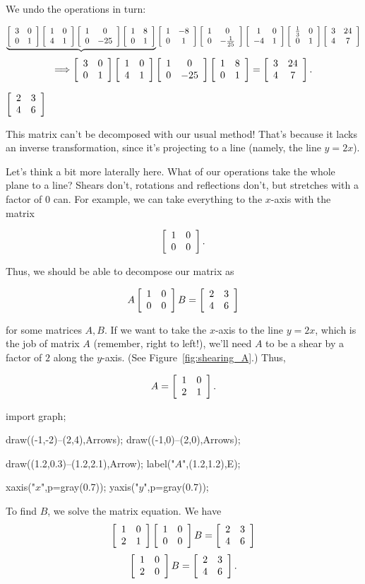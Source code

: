 \documentclass[../key.tex]{subfiles}
\begin{document}
We undo the operations in turn:

$$\underbrace{\twomat{3}{0}{0}{1}\twomat{1}{0}{4}{1}\twomat{1}{0}{0}{-25}\twomat{1}{8}{0}{1}}\twomat{1}{-8}{0}{1}\twomat{1}{0}{0}{-\frac{1}{25}}\twomat{1}{0}{-4}{1}\twomat{\frac{1}{3}}{0}{0}{1}\twomat{3}{24}{4}{7}$$
$$\Longrightarrow \twomat{3}{0}{0}{1}\twomat{1}{0}{4}{1}\twomat{1}{0}{0}{-25}\twomat{1}{8}{0}{1} = \twomat{3}{24}{4}{7}.$$

\begin{inner_problem}
\item $\twomat{2}{3}{4}{6}$
\end{inner_problem}

This matrix can't be decomposed with our usual method! That's because it lacks an inverse transformation, since it's projecting to a line (namely, the line $y=2x$).

Let's think a bit more laterally here. What of our operations take the whole plane to a line? Shears don't, rotations and reflections don't, but stretches with a factor of $0$ can. For example, we can take everything to the $x$-axis with the matrix

$$\twomat{1}{0}{0}{0}.$$

Thus, we should be able to decompose our matrix as

$$A\twomat{1}{0}{0}{0}B=\twomat{2}{3}{4}{6}$$

for some matrices $A,B$. If we want to take the $x$-axis to the line $y=2x$, which is the job of matrix $A$ (remember, right to left!), we'll need $A$ to be a shear by a factor of $2$ along the $y$-axis. (See Figure~\ref{fig:shearing_A}.) Thus,

$$A=\twomat{1}{0}{2}{1}.$$

\begin{center}
	\begin{asy}[width=0.26\textwidth]
		import graph;

		draw((-1,-2)--(2,4),Arrows);
		draw((-1,0)--(2,0),Arrows);

		draw((1.2,0.3)--(1.2,2.1),Arrow);
		label("$A$",(1.2,1.2),E);

		xaxis("$x$",p=gray(0.7));
		yaxis("$y$",p=gray(0.7));
	\end{asy}
	\label{fig:shearing_A}
\end{center}

To find $B$, we solve the matrix equation. We have $$\twomat{1}{0}{2}{1}\twomat{1}{0}{0}{0}B=\twomat{2}{3}{4}{6}$$
$$\twomat{1}{0}{2}{0}B=\twomat{2}{3}{4}{6}.$$
\end{document}
